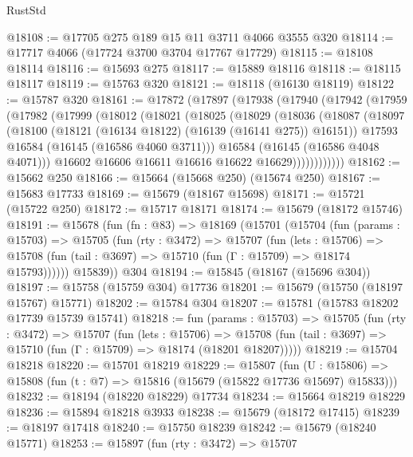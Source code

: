 \begin{lexlean}{RustStd}
\begin{coremodule}
{\begin{coremodule}
{{{{{{{{{{{{{{{{{{{{{{{{{{{{{{{{{{{{{{{{{{{{{{{@18108 := @17705 @275 @189 @15 @11 @3711 @4066 @3555 @320
@18114 := @17717 @4066 (@17724 @3700 @3704 @17767 @17729)
@18115 := @18108 @18114
@18116 := @15693 @275
@18117 := @15889 @18116
@18118 := @18115 @18117
@18119 := @15763 @320
@18121 := @18118 (@16130 @18119)
@18122 := @15787 @320
@18161 := @17872
    (@17897
      (@17938
        (@17940
          (@17942
            (@17959
              (@17982
                (@17999
                  (@18012
                    (@18021
                      (@18025
                        (@18029
                          (@18036
                            (@18087
                              (@18097
                                (@18100 (@18121 (@16134 @18122) (@16139 (@16141 @275)) @16151))
                                @17593
                                @16584
                                (@16145 (@16586 @4060 @3711)))
                              @16584
                              (@16145 (@16586 @4048 @4071)))
                            @16602
                            @16606
                            @16611
                            @16616
                            @16622
                            @16629))))))))))))
@18162 := @15662 @250
@18166 := @15664 (@15668 @250) (@15674 @250)
@18167 := @15683 @17733
@18169 := @15679 (@18167 @15698)
@18171 := @15721 (@15722 @250)
@18172 := @15717 @18171
@18174 := @15679 (@18172 @15746)
@18191 := @15678
    (fun (fn : @83) =>
    @18169
      (@15701
        (@15704
          (fun (params : @15703) =>
          @15705
            (fun (rty : @3472) =>
            @15707
              (fun (lets : @15706) =>
              @15708 (fun (tail : @3697) => @15710 (fun (Γ : @15709) => @18174 @15793))))))
        @15839))
    @304
@18194 := @15845 (@18167 (@15696 @304))
@18197 := @15758 (@15759 @304) @17736
@18201 := @15679 (@15750 (@18197 @15767) @15771)
@18202 := @15784 @304
@18207 := @15781 (@15783 @18202 @17739 @15739 @15741)
@18218 := fun (params : @15703) =>
  @15705
    (fun (rty : @3472) =>
    @15707
      (fun (lets : @15706) =>
      @15708 (fun (tail : @3697) => @15710 (fun (Γ : @15709) => @18174 (@18201 @18207)))))
@18219 := @15704 @18218
@18220 := @15701 @18219
@18229 := @15807
    (fun (U : @15806) => @15808 (fun (t : @7) => @15816 (@15679 (@15822 @17736 @15697) @15833)))
@18232 := @18194 (@18220 @18229) @17734
@18234 := @15664 @18219 @18229
@18236 := @15894 @18218 @3933
@18238 := @15679 (@18172 @17415)
@18239 := @18197 @17418
@18240 := @15750 @18239
@18242 := @15679 (@18240 @15771)
@18253 := @15897
    (fun (rty : @3472) =>
    @15707
}}}}}}}}}}}}}}}}}}}}}}}}}}}}}}}}}}}}}}}}}}}}}}}
\end{coremodule}}
\end{coremodule}
\end{lexlean}
